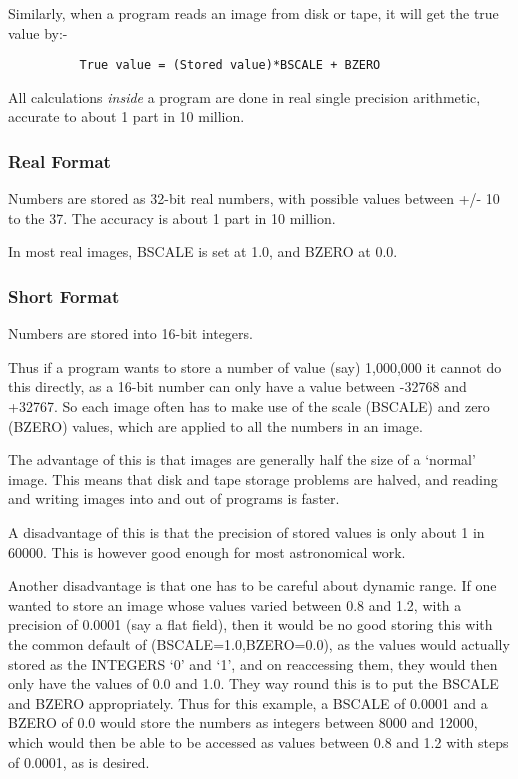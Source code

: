 Similarly, when a program reads an image from disk or tape, it will get
the true value by:-

\begin{verbatim}
          True value = (Stored value)*BSCALE + BZERO
\end{verbatim}


All calculations {\em inside} a program are done in real single
precision arithmetic, accurate to about 1 part in 10 million.


\subsubsection{Real Format}

Numbers are stored as 32-bit real numbers, with possible values between
+/- 10 to the 37. The accuracy is about 1 part in 10 million.


In most real images, BSCALE is set at 1.0, and BZERO at 0.0.


\subsubsection{Short Format}

Numbers are stored into 16-bit integers.

Thus if a program wants to store a number of value (say) 1,000,000 it
cannot do this directly, as a 16-bit number can only have a value
between -32768 and +32767. So each image often has to make use of the
scale (BSCALE) and zero (BZERO) values, which are applied to all the
numbers in an image.


The advantage of this is that images are generally half the size of a
`normal' image. This means that disk and tape storage problems are
halved, and reading and writing images into and out of programs is
faster.

A disadvantage of this is that the precision of stored values is only
about 1 in 60000. This is however good enough for most astronomical
work.

Another disadvantage is that one has to be careful about dynamic range.
If one wanted to store an image whose values varied between 0.8 and
1.2, with a precision of 0.0001 (say a flat field), then it would be no
good storing this with the common default of (BSCALE=1.0,BZERO=0.0), as
the values would actually stored as the INTEGERS `0' and `1', and on
reaccessing them, they would then only have the values of 0.0 and 1.0.
They way round this is to put the BSCALE and BZERO appropriately. Thus
for this example, a BSCALE of 0.0001 and a BZERO of 0.0 would store the
numbers as integers between 8000 and 12000, which would then be able to
be accessed as values between 0.8 and 1.2 with steps of 0.0001, as is
desired.

